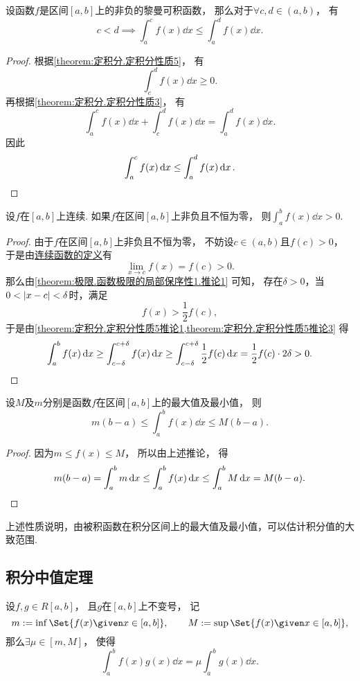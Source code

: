 \begin{corollary}\label{theorem:定积分.定积分性质5推论3}
设函数\(f\)是区间\([a,b]\)上的非负的黎曼可积函数，
那么对于\(\forall c,d\in(a,b)\)，
有\[
	c<d
	\implies
	\int_a^c f(x) \dd{x} \leq \int_a^d f(x) \dd{x}.
\]
\begin{proof}
根据\cref{theorem:定积分.定积分性质5}，
有\[
	\int_c^d f(x) \dd{x} \geq 0.
\]
再根据\cref{theorem:定积分.定积分性质3}，
有\[
	\int_a^c f(x) \dd{x}
	+ \int_c^d f(x) \dd{x}
	= \int_a^d f(x) \dd{x}.
\]
因此\[
	\int_a^c f(x) \dd{x}
	\leq
	\int_a^d f(x) \dd{x}.
	\qedhere
\]
\end{proof}
\end{corollary}

\begin{corollary}
设\(f\)在\([a,b]\)上连续.
如果\(f\)在区间\([a,b]\)上非负且不恒为零，
则\(\int_a^b f(x) \dd{x} > 0\).
\begin{proof}
由于\(f\)在区间\([a,b]\)上非负且不恒为零，
不妨设\(c \in (a,b)\)且\(f(c)>0\)，
于是由\hyperref[definition:极限.函数在一点的连续性]{连续函数的定义}有\[
	\lim_{x \to c} f(x) = f(c) > 0.
\]
那么由\cref{theorem:极限.函数极限的局部保序性1.推论1} 可知，
存在\(\delta>0\)，当\(0 < \abs{x-c} < \delta\)时，满足\[
	f(x) > \frac12 f(c),
\]
于是由\cref{theorem:定积分.定积分性质5推论1,theorem:定积分.定积分性质5推论3} 得\[
	\int_a^b f(x) \dd{x}
	\geq \int_{c-\delta}^{c+\delta} f(x) \dd{x}
	\geq \int_{c-\delta}^{c+\delta} \frac12 f(c) \dd{x}
	= \frac12 f(c) \cdot 2 \delta
	> 0.
	\qedhere
\]
\end{proof}
\end{corollary}

\begin{property}\label{theorem:定积分.定积分性质6}
设\(M\)及\(m\)分别是函数\(f\)在区间\([a,b]\)上的最大值及最小值，
则\[
	m(b-a) \leq \int_a^b f(x) \dd{x} \leq M(b-a).
\]
\begin{proof}
因为\(m \leq f(x) \leq M\)，
所以由上述推论，
得\[
	m(b-a)
	= \int_a^b m \dd{x}
	\leq \int_a^b f(x) \dd{x}
	\leq \int_a^b M \dd{x}
	= M(b-a).
	\qedhere
\]
\end{proof}
\end{property}
上述性质说明，由被积函数在积分区间上的最大值及最小值，可以估计积分值的大致范围.

\subsection{积分中值定理}
\begin{theorem}[积分第一中值定理]\label{theorem:定积分.积分中值定理1}
设\(f,g \in R[a,b]\)，
且\(g\)在\([a,b]\)上不变号，
记\[
	m \defeq \inf\Set{ f(x) \given x \in [a,b] }, \qquad
	M \defeq \sup\Set{ f(x) \given x \in [a,b] },
\]
那么\(\exists\mu\in[m,M]\)，
使得\begin{equation}
	\int_a^b f(x) g(x) \dd{x} = \mu \int_a^b g(x) \dd{x}.
\end{equation}
\end{theorem}


